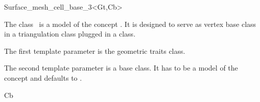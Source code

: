 

\begin{ccRefClass}{Surface_mesh_cell_base_3<Gt,Cb>}  %


\ccDefinition
  
The class \ccRefName\ is a model of the concept
.
It is designed to serve  as vertex base  class
in a  triangulation class  
plugged in a  
class.

The first template parameter is the geometric traits class.

The second template parameter is a base class. It
has to be a model of the concept 
and  
defaults to .


\ccIsModel


\ccInheritsFrom 

Cb







\ccSeeAlso

 \\
 \\
 \\



\end{ccRefClass}
